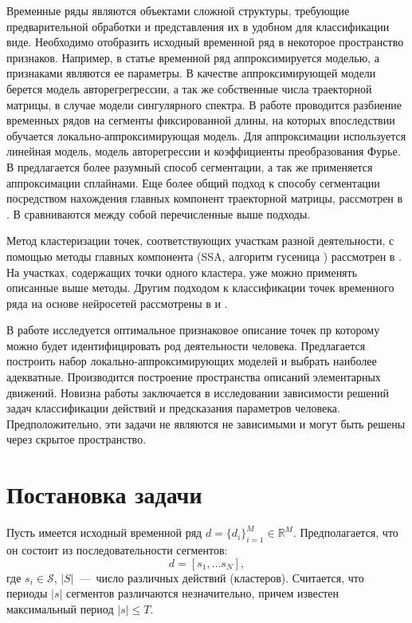 \documentclass[12pt, twoside]{article}
\begin{document}
Временные ряды являются объектами сложной структуры, требующие предварительной обработки и представления их в удобном для классификации виде. Необходимо отобразить исходный временной ряд в некоторое пространство признаков. Например, в статье \cite{Ivkin15} временной ряд аппроксимируется моделью, а признаками являются ее параметры. В качестве аппроксимирующей модели берется модель авторегрегрессии, а так же собственные числа траекторной матрицы, в случае модели сингулярного спектра. В работе \cite{Karasikov16} проводится разбиение временных рядов на сегменты фиксированной длины, на которых впоследствии обучается локально-аппроксимирующая модель. Для аппроксимации используется линейная модель, модель авторегрессии и коэффициенты преобразования Фурье. В \cite{Anikeev18} предлагается более разумный способ сегментации, а так же применяется аппроксимации сплайнами. Еще более общий подход к способу сегментации посредством нахождения главных компонент траекторной матрицы, рассмотрен в \cite{Motrenko16}. В \cite{Bochkarev18} сравниваются между собой перечисленные выше подходы.

Метод кластеризации точек, соответствующих участкам разной деятельности, с помощью методы главных компонента (SSA, алгоритм гусеница \cite{Danilov97}) рассмотрен в \cite{Grabovoy20}. На участках, содержащих точки одного кластера, уже можно применять описанные выше методы. Другим подходом к классификации точек временного ряда на основе нейросетей рассмотрены в \cite{Dafne19} и \cite{Cinar18}.

В работе исследуется оптимальное признаковое описание точек пр которому можно будет идентифицировать род деятельности человека. Предлагается построить набор локально-аппроксимирующих моделей и выбрать наиболее адекватные. Производится построение пространства описаний элементарных движений. Новизна работы заключается в исследовании зависимости решений задач классификации действий и предсказания параметров человека. Предположительно, эти задачи не являются не зависимыми и могут быть решены через скрытое пространство.

\section{Постановка задачи}

Пусть имеется исходный временной ряд $d=\{d_i\}_{i=1}^M\in \mathds{R}^M$. Предполагается, что он состоит из последовательности сегментов: $$d=[s_1,\ldots s_N],$$ где $s_i\in \mathcal{S}$, $|S|$~---~число различных действий (кластеров). Считается, что периоды $|s|$ сегментов различаются незначительно, причем известен максимальный период $|s|\leq T$.
\end{document}

